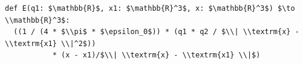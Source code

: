 \documentclass[border=10pt]{standalone}
\begin{document}
\begin{lstlisting}
def E(q1: $\mathbb{R}$, x1: $\mathbb{R}^3$, x: $\mathbb{R}^3$) $\to \\mathbb{R}^3$:
  ((1 / (4 * $\\pi$ * $\epsilon_0$)) * (q1 * q2 / $\\| \\textrm{x} - \\textrm{x1} \\|^2$)) 
           * (x - x1)/$\\| \\textrm{x} - \\textrm{x1} \\|$)
\end{lstlisting}
\end{document}
